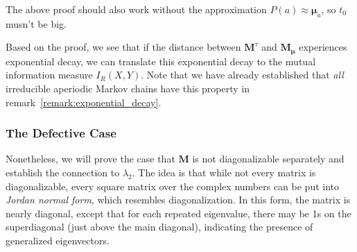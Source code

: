 \documentclass[../../main.tex]{subfiles}
\begin{document}
    \bigskip
    \begin{remark}
        The above proof should also work without the approximation $P(a) \approx \bm{\mu}_a$, so $t_0$ musn't be big.
    \end{remark}

    \begin{remark}
        Based on the proof, we see that if the distance between $\bm{M}^\tau$ and $\bm{M_\mu}$ experiences exponential decay, we can translate this exponential decay to the mutual information measure $I_R(X, Y)$. Note that we have already established that \emph{all} irreducible aperiodic Markov chains have this property in remark~\ref{remark:exponential_decay}.
    \end{remark}

\subsubsection{The Defective Case}
    \label{section:the_defectvie_case}
    Nonetheless, we will prove the case that $\bm{M}$ is not diagonalizable separately and establish the connection to $\lambda_2$. The idea is that while not every matrix is diagonalizable, every square matrix over the complex numbers can be put into \emph{Jordan normal form}, which resembles diagonalization. In this form, the matrix is nearly diagonal, except that for each repeated eigenvalue, there may be 1s on the superdiagonal (just above the main diagonal), indicating the presence of generalized eigenvectors.
\end{document}
